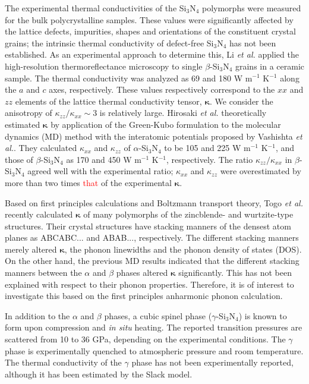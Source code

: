 \documentclass[twocolumn,amsmath,amssymb,a4paper,prb,superscriptaddress,floatfix]{revtex4-1}
\begin{document}
The experimental thermal conductivities
\cite{zhou,hirao-rev,watari,hirosaki,hirai} of the Si$_3$N$_4$ polymorphs were
measured for the bulk polycrystalline samples. These values were significantly
affected by the lattice defects, impurities, shapes and orientations of the
constituent crystal grains;\cite{hirosaki-md} the intrinsic thermal conductivity
of defect-free Si$_3$N$_4$ has not been established. As an experimental approach
to determine this, Li {\it et al.}\cite{li} applied the high-resolution
thermoreflectance microscopy to single $\beta$-Si$_3$N$_4$ grains in a ceramic
sample. The thermal conductivity was analyzed as 69 and 180 W m$^{-1}$ K$^{-1}$
along the $a$ and $c$ axes, respectively.  These values respectively correspond
to the $xx$ and $zz$ elements of the lattice thermal conductivity tensor,
$\boldsymbol{\kappa}$. We consider the anisotropy of
$\kappa_{zz}/\kappa_{xx}\sim 3$ is relatively large. Hirosaki {\it et
al.}\cite{hirosaki-md} theoretically estimated $\boldsymbol{\kappa}$ by
application of the Green-Kubo formulation to the molecular dynamics (MD) method
with the interatomic potentials proposed by Vashishta {\it et
al.}\cite{vashishta}.  They calculated $\kappa$$_{xx}$ and $\kappa$$_{zz}$ of
$\alpha$-Si$_3$N$_4$ to be 105 and 225 W m$^{-1}$ K$^{-1}$, and those of
$\beta$-Si$_3$N$_4$ as 170 and 450 W m$^{-1}$ K$^{-1}$, respectively.  The ratio
$\kappa_{zz}/\kappa_{xx}$ in $\beta$-Si$_3$N$_4$ agreed well with the
experimental ratio; $\kappa_{xx}$ and $\kappa_{zz}$ were overestimated by more
than two times \textcolor{red}{that} of the experimental $\boldsymbol{\kappa}$. 

Based on first principles calculations and Boltzmann transport
theory\cite{phono3py}, Togo {\it{et al.}} recently calculated
$\boldsymbol{\kappa}$ of many polymorphs of the zincblende- and wurtzite-type
structures. Their crystal structures have stacking manners of the densest atom
planes as ABCABC... and ABAB..., respectively. The different stacking manners
merely altered $\boldsymbol{\kappa}$, the phonon linewidths and the phonon
density of states (DOS).\cite{phono3py} On the other hand, the previous MD
results indicated that the different stacking manners between the $\alpha$ and
$\beta$ phases altered $\boldsymbol{\kappa}$ significantly. This has not been
explained with respect to their phonon properties. Therefore, it is of interest
to investigate this based on the first principles anharmonic phonon calculation.

In addition to the $\alpha$ and $\beta$ phases, a cubic spinel phase
($\gamma$-Si$_3$N$_4$) is known to form upon compression and {\it{in situ}}
heating.\cite{zerr,zhang} The reported transition pressures are scattered from
10 to 36 GPa, depending on the experimental conditions.\cite{xu}  The $\gamma$
phase is experimentally quenched to atmospheric pressure and room temperature.
The thermal conductivity of the $\gamma$ phase has not been experimentally
reported, although it has been estimated by the Slack model.\cite{morelli} 
\end{document}

